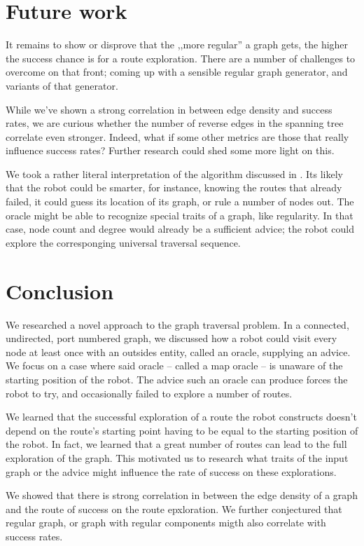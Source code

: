 \documentclass{article}
\begin{document}
\restoregeometry

\section{Future work}
\label{sec:future-work}

It remains to show or disprove that the ,,more regular'' a graph gets, the higher the success chance is for a route exploration. There are a number of challenges to overcome on that front; coming up with a sensible regular graph generator, and variants of that generator.

While we've shown a strong correlation in between edge density and success rates, we are curious whether the number of reverse edges in the spanning tree correlate even stronger. Indeed, what if some other metrics are those that really influence success rates? Further research could shed some more light on this.

We took a rather literal interpretation of the algorithm discussed in \cite{gorain2018deterministic}. Its likely that the robot could be smarter, for instance, knowing the routes that already failed, it could guess its location of its graph, or rule a number of nodes out. The oracle might be able to recognize special traits of a graph, like regularity. In that case, node count and degree would already be a sufficient advice; the robot could explore the corresponging universal traversal sequence.

\section{Conclusion}

We researched a novel approach to the graph traversal problem. In a connected, undirected, port numbered graph, we discussed how a robot could visit every node at least once with an outsides entity, called an oracle, supplying an advice. We focus on a case where said oracle -- called a map oracle -- is unaware of the starting position of the robot. The advice such an oracle can produce forces the robot to try, and occasionally failed to explore a number of routes.

We learned that the successful exploration of a route the robot constructs doesn't depend on the route's starting point having to be equal to the starting position of the robot. In fact, we learned that a great number of routes can lead to the full exploration of the graph. This motivated us to research what traits of the input graph or the advice might influence the rate of success on these explorations.

We showed that there is strong correlation in between the edge density of a graph and the route of success on the route epxloration. We further conjectured that regular graph, or graph with regular components migth also correlate with success rates.



\end{document}
